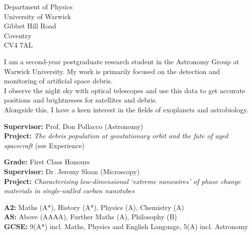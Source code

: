 
\begin{flushright}
\vspace{-1em}
\small Department of Physics\\
University of Warwick\\
Gibbet Hill Road\\
Coventry\\
CV4 7AL
\end{flushright}

\medskip

\vspace{-1em}
\small \justify I am a second-year postgraduate research student in the Astronomy Group at Warwick University.
My work is primarily focused on the detection and monitoring of artificial space debris. \\
I observe the night sky with optical telescopes and use this data to get accurate positions and brightnesses for satellites and debris. \\
Alongside this, I have a keen interest in the fields of exoplanets and astrobiology.

\medskip


\vspace{-1em}
\small \justify \textbf{Supervisor:} Prof. Don Pollacco (Astronomy) \\
\textbf{Project:} \textit{The debris population at geostationary orbit and the fate of aged spacecraft} (see Experience)

\divider

\small \textbf{Grade:} First Class Honours \\
\textbf{Supervisor:} Dr. Jeremy Sloan (Microscopy) \\
\textbf{Project:} \textit{Characterising low-dimensional `extreme nanowires' of phase change materials in single-walled carbon nanotubes}

\divider

\small \textbf{A2:} Maths (A*), History (A*), Physics (A), Chemistry (A) \\
\textbf{AS:} Above (AAAA), Further Maths (A), Philosophy (B) \\
\textbf{GCSE:} 9(A*) incl. Maths, Physics and English Language, 5(A) incl. Astronomy
